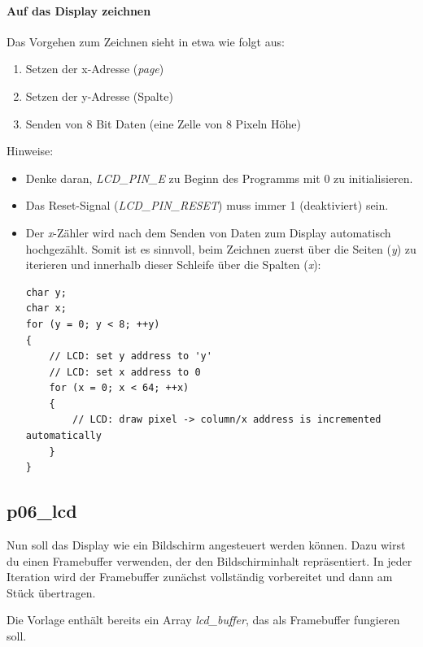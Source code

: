 \paragraph*{Auf das Display zeichnen}

Das Vorgehen zum Zeichnen sieht in etwa wie folgt aus:
\begin{enumerate}
	\item Setzen der x-Adresse (\emph{page})
	\item Setzen der y-Adresse (Spalte)
	\item Senden von 8 Bit Daten (eine \glqq{}Zelle\grqq{} von 8 Pixeln Höhe)
\end{enumerate}


Hinweise:
\begin{itemize}
\item
Denke daran, \emph{LCD\_PIN\_E} zu Beginn des Programms mit 0 zu initialisieren.

\item
Das Reset-Signal (\emph{LCD\_PIN\_RESET}) muss immer 1 (deaktiviert) sein.

\item
Der \textit{x}-Zähler wird nach dem Senden von Daten zum Display automatisch hochgezählt.
Somit ist es sinnvoll, beim Zeichnen zuerst über die Seiten (\emph{y}) zu iterieren und innerhalb dieser Schleife über die Spalten (\emph{x}):
\begin{lstlisting}
char y;
char x;
for (y = 0; y < 8; ++y)
{
	// LCD: set y address to 'y'
	// LCD: set x address to 0
	for (x = 0; x < 64; ++x)
	{
	    // LCD: draw pixel -> column/x address is incremented automatically
	}
}
\end{lstlisting}
\end{itemize}

\subsection{p06\_lcd}
Nun soll das Display wie ein Bildschirm angesteuert werden können.
Dazu wirst du einen Framebuffer verwenden, der den Bildschirminhalt repräsentiert.
In jeder Iteration wird der Framebuffer zunächst vollständig vorbereitet und dann am Stück übertragen.

Die Vorlage enthält bereits ein Array \textit{lcd\_buffer}, das als Framebuffer fungieren soll.

